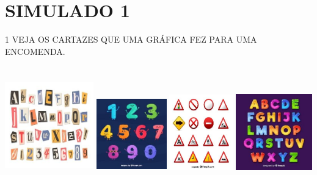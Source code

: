 \chapter{SIMULADO 1}

\num{1} VEJA OS CARTAZES QUE UMA GRÁFICA FEZ PARA UMA ENCOMENDA.

\includegraphics[width=1.51042in,height=2.00000in]{media/image183.jpg}
\includegraphics[width=1.19792in,height=1.68472in]{media/image184.jpg}
\includegraphics[width=1.08681in,height=1.72778in]{media/image185.jpg}
\includegraphics[width=1.30208in,height=1.73819in]{media/image186.jpg}

